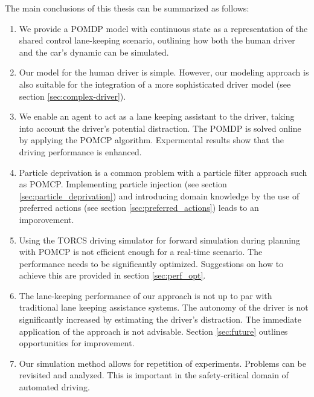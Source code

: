 \vspace{1em}
\noindent
The main conclusions of this thesis can be summarized as follows:
\begin{enumerate}
    \item We provide a POMDP model with continuous state as a representation of the shared control lane-keeping scenario, outlining how both the human driver and the car's dynamic can be simulated. 
    \item Our model for the human driver is simple. However, our modeling approach is also suitable for the integration of a more sophisticated driver model (see section \ref{sec:complex-driver}).
    \item We enable an agent to act as a lane keeping assistant to the driver, taking into account the driver's potential distraction. The POMDP is solved online by applying the POMCP algorithm. Expermental results show that the driving performance is enhanced.
    \item Particle deprivation is a common problem with a particle filter approach such as POMCP. Implementing particle injection (see section \ref{sec:particle_deprivation}) and introducing domain knowledge by the use of preferred actions (see section \ref{sec:preferred_actions}) leads to an imporovement.
    \item Using the TORCS driving simulator for forward simulation during planning with POMCP is not efficient enough for a real-time scenario. The performance needs to be significantly optimized. Suggestions on how to achieve this are provided in section \ref{sec:perf_opt}.
    \item The lane-keeping performance of our approach is not up to par with traditional lane keeping assistance systems. The autonomy of the driver is not significantly increased by estimating the driver's distraction. The immediate application of the approach is not advisable. Section \ref{sec:future} outlines opportunities for improvement.
    \item Our simulation method allows for repetition of experiments. Problems can be revisited and analyzed. This is important in the safety-critical domain of automated driving.
\end{enumerate}




